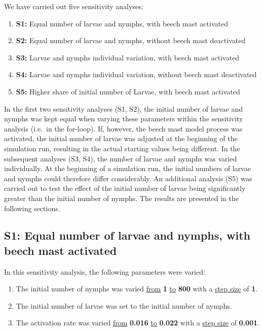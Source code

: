 \documentclass[a4paper, 11pt]{scrartcl}
\begin{document}
We have carried out five sensitivity analyses:

\begin{enumerate}
\item[] \textbf{S1:} Equal number of larvae and nymphs, with beech mast activated
\item[] \textbf{S2:} Equal number of larvae and nymphs, without beech mast deactivated
\item[] \textbf{S3:} Larvae and nymphs individual variation, with beech mast activated
\item[] \textbf{S4:} Larvae and nymphs individual variation, without beech mast deactivated
\item[] \textbf{S5:} Higher share of initial number of Larvae, with beech mast activated
\end{enumerate}

In the first two sensitivity analyses (S1, S2), the initial number of larvae and nymphs was kept equal when varying these parameters within the sensitivity analysis (i.e.\ in
the for-loop). If, however, the beech mast model process was activated, the initial number of larvae was adjusted at the beginning of the simulation run, resulting in the actual
starting values being different. In the subsequent analyses (S3, S4), the number of larvae and nymphs was varied individually. At the beginning of a simulation run, the initial
numbers of larvae and nymphs could therefore differ considerably. An additional analysis (S5) was carried out to test the effect of the initial number of larvae being
significantly greater than the initial number of nymphs. The results are presented in the following sections.


\newpage
\subsection{S1: Equal number of larvae and nymphs, with beech mast activated}
In this sensitivity analysis, the following parameters were varied:

\begin{enumerate}
\item The initial number of nymphs was varied \underline{from} \textbf{1} \underline{to} \textbf{800} with a \underline{step size} of \textbf{1}.
\item The initial number of larvae was set to the initial number of nymphs.
\item The activation rate was varied \underline{from} \textbf{0.016} \underline{to} \textbf{0.022} with a \underline{step size} of \textbf{0.001}.
\end{enumerate}
\end{document}
